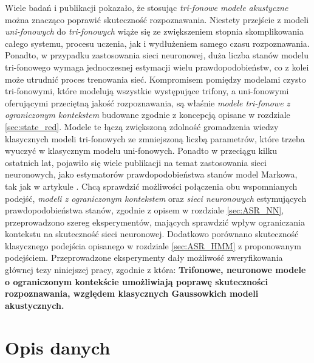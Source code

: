 \documentclass[shortabstract, mgr]{iithesis}
\begin{document}
	Wiele badań i publikacji pokazało, że stosując \textit{tri-fonowe modele akustyczne} można znacząco poprawić skuteczność rozpoznawania. Niestety przejście z modeli \textit{uni-fonowych} do \textit{tri-fonowych} wiąże się ze zwiększeniem stopnia skomplikowania całego systemu, procesu uczenia, jak i wydłużeniem samego czasu rozpoznawania. Ponadto, w przypadku zastosowania sieci neuronowej, duża liczba stanów modelu tri-fonowego wymaga jednoczesnej estymacji wielu prawdopodobieństw, co z kolei może utrudnić proces trenowania sieć. Kompromisem pomiędzy modelami czysto tri-fonowymi, które modelują wszystkie występujące trifony, a uni-fonowymi oferującymi przeciętną jakość rozpoznawania, są właśnie \textit{modele tri-fonowe z ograniczonym kontekstem} budowane zgodnie z koncepcją opisane w rozdziale \ref{sec:state_red}. Modele te łączą zwiększoną zdolność gromadzenia wiedzy klasycznych modeli tri-fonowych ze zmniejszoną liczbą parametrów, które trzeba wyuczyć w klasycznym modelu uni-fonowych. Ponadto w przeciągu kilku ostatnich lat, pojawiło się wiele publikacji na temat zastosowania sieci neuronowych, jako estymatorów prawdopodobieństwa stanów model Markowa, tak jak w artykule \cite{article1}. Chcą sprawdzić możliwości połączenia obu wspomnianych podejść, \textit{modeli z ograniczonym kontekstem} oraz \textit{sieci neuronowych} estymujących prawdopodobieństwa stanów, zgodnie z opisem w rozdziale \ref{sec:ASR_NN}, przeprowadzono szereg eksperymentów, mających sprawdzić wpływ ograniczania kontekstu na skuteczność sieci neuronowej. Dodatkowo porównano skuteczność klasycznego podejścia opisanego w rozdziale \ref{sec:ASR_HMM} z proponowanym podejściem. Przeprowadzone eksperymenty dały możliwość zweryfikowania głównej tezy niniejszej pracy, zgodnie z która: \textbf{Trifonowe, neuronowe modele o ograniczonym kontekście umożliwiają poprawę skuteczności rozpoznawania, względem klasycznych Gaussowkich modeli akustycznych.}
	
	\section{ Opis danych}
	\label{sec:opis_danych}
	
\end{document}

